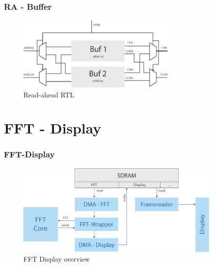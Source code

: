 \documentclass{beamer}
\begin{document}
\begin{frame}\frametitle{RA - Buffer}
    \begin{figure}[hp]
      \centering
      \includegraphics[width=0.7\textwidth]{pictures/read_ahead_gatter}
      \caption{Read-ahead RTL}
      \label{fig:fft_display_struct}
    \end{figure}
\end{frame}

\section{FFT - Display}
\begin{frame}\frametitle{FFT-Display}
    \begin{figure}[hp]
      \centering
      \includegraphics[width=0.9\textwidth]{pictures/fft_display}
      \caption{FFT Display overview}
      \label{fig:fft_display_struct}
    \end{figure}
\end{frame}
\end{document}
